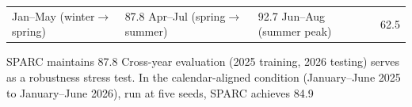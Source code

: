 {\begin{table}[t]
{\begin{tabular}{llll}
\midrule
Jan--May (winter$\rightarrow$spring) & 87.8%
Apr--Jul (spring$\rightarrow$summer) & 92.7%
Jun--Aug (summer peak) & 62.5%
\bottomrule
\end{tabular}
}
\end{table}
SPARC maintains 87.8%
Cross-year evaluation (2025 training, 2026 testing) serves as a robustness stress test. In the calendar-aligned condition (January--June 2025 to January--June 2026), run at five seeds, SPARC achieves 84.9%
}
